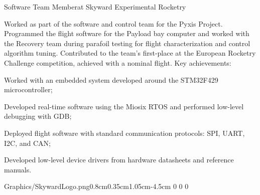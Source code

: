 \documentclass[10pt,onesize,a4paper,titlepage]{article}
\begin{document}
    \begin{tcolorbox}[grow to left by=0.55cm,colframe=white,colback=white]

        {Software Team Member}{at Skyward Experimental Rocketry}
        {
            Worked as part of the software and control team for the Pyxis Project. Programmed the flight software for the Payload bay computer and worked with the Recovery team during parafoil testing for flight characterization and control algorithm tuning. Contributed to the team's first-place at the European Rocketry Challenge competition, achieved with a nominal flight.
            \newline
            \newline Key achievements: 
            {
                \begin{compactitem}[-]
                    \item Worked with an embedded system developed around the STM32F429 microcontroller;
                    \item Developed real-time software using the Miosix RTOS and performed low-level debugging with GDB;
                    \item Deployed flight software with standard communication protocols: SPI, UART, I2C, and CAN;
                    \item Developed low-level device drivers from hardware datasheets and reference manuals.
                \end{compactitem}
            }
        }
        {Graphics/SkywardLogo.png}{0.8cm}{0.35cm}{1.05cm}{-4.5cm 0 0 0}
    \end{tcolorbox}
    
\end{document}
